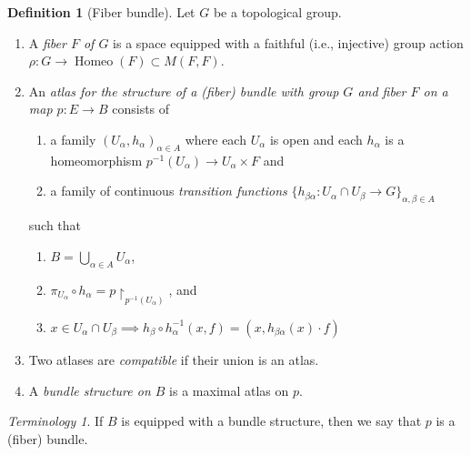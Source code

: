 \documentclass[10pt,letterpaper,cm]{nupset}
\theoremstyle{definition}
\newtheorem{defn}{Definition}[subsection]
\theoremstyle{theorem}
\theoremstyle{remark}
\newtheorem*{term}{Terminology}
\newcommand{\1}{\mathbb{1}}
\newcommand{\0}{\vec 0}
\DeclareMathOperator{\homeo}{Homeo}
\newcommand{\be}{\begin{enumerate}}
\newcommand{\ee}{\end{enumerate}}
\begin{document}
\begin{defn}[Fiber bundle] Let $G$ be a topological group.
\be 
\item A \textit{fiber $F$ of $G$} is a space equipped with a faithful (i.e., injective) group action $\rho : G \to \homeo(F) \subset M(F, F)$. 
\item An \textit{atlas for the structure of a (fiber) bundle with group $G$ and fiber $F$ on a map $p: E \to B$} consists of 
\be
\item a family $(U_{\alpha}, h_{\alpha})_{\alpha \in A}$ where each $U_{\alpha}$ is open and each $h_{\alpha}$ is a homeomorphism $p^{-1}(U_{\alpha}) \to U_{\alpha} \times F$ and
\item  a family of continuous \textit{transition functions} $\{h_{\beta{\alpha}} : U_{\alpha} \cap U_{\beta} \to G\}_{\alpha, \beta \in A}$ 
\ee such that
\be[label= \roman*]
\item $B = \bigcup_{\alpha \in A} U_{\alpha}$,
\item $\pi_{U_{\alpha}} \circ h_{\alpha} = p\restriction_{p^{-1}(U_{\alpha})}$, and
\item  $x\in U_{\alpha} \cap U_{\beta} \implies h_{\beta} \circ h_{\alpha}^{-1}(x,f) = (x, h_{\beta{\alpha}}(x)\cdot f)$
\ee
\item Two atlases are \textit{compatible} if their union is an atlas. 
\item A \textit{bundle structure on $B$} is a maximal atlas on $p$. 
\ee
\end{defn}

\begin{term}
If $B$ is equipped with a bundle structure, then we say that $p$ is a (fiber) bundle.
\end{term}
\end{document}
